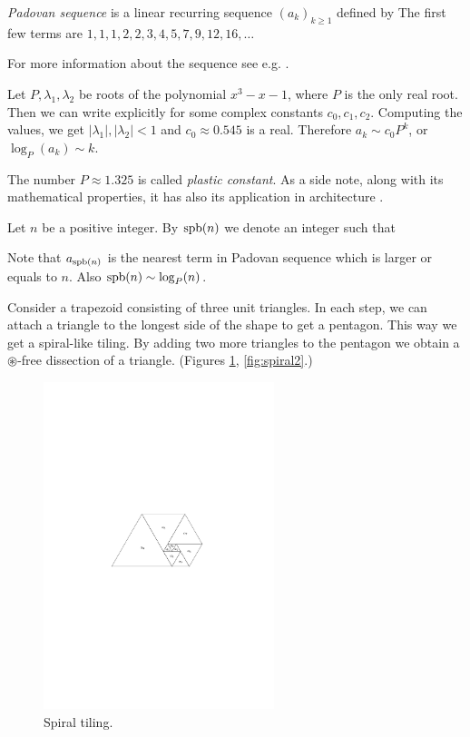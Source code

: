 \begin{defn}
\emph{Padovan sequence} is a linear recurring sequence $(a_k)_{k \geq 1}$ defined by
%
The first few terms are $1, 1, 1, 2, 2, 3, 4, 5, 7, 9, 12, 16,\dots$
\end{defn}

For more information about the sequence see e.g. \cite{OEIS}.

Let $P, \lambda_1, \lambda_2$ be roots of the polynomial $x^3-x-1$, where $P$ is the only real root. Then we can write explicitly
%
for some complex constants $c_0,c_1,c_2$. Computing the values, we get $|\lambda_1|, |\lambda_2| < 1$ and $c_0 \approx 0.545$ is a real. Therefore $a_k \sim c_0P^k$, or $\log_P(a_k) \sim k$.

The number $P \approx 1.325$ is called \emph{plastic constant}. As a side note, along with its mathematical properties, it has also its application in architecture \cite{Stewart96}.

\begin{defn}
Let $n$ be a positive integer. By $\mathop{\mathrm{spb}}(n)$ we denote an integer such that
\end{defn}

Note that $a_{\mathop{\mathrm{spb}}(n)}$ is the nearest term in Padovan sequence which is larger or equals to $n$. Also $\mathop{\mathrm{spb}}(n) \sim \log_P(n)$.

Consider a trapezoid consisting of three unit triangles. In each step, we can attach a triangle to the longest side of the shape to get a pentagon. This way we get a spiral-like tiling. By adding two more triangles to the pentagon we obtain a $\circledast$-free dissection of a triangle. (Figures \ref{fig:spiral}, \ref{fig:spiral2}.)

\begin{figure}[htb]
\centering
\includegraphics[width=0.6\textwidth]{img/spiral.pdf}
\caption{Spiral tiling.}
\label{fig:spiral}
\end{figure}

